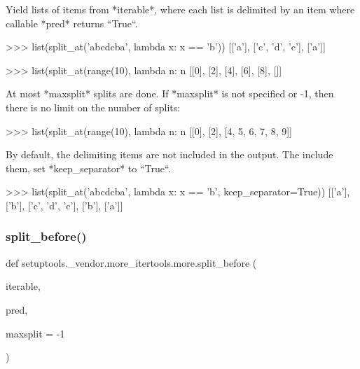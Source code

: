 \begin{DoxyVerb}Yield lists of items from *iterable*, where each list is delimited by
an item where callable *pred* returns ``True``.

    >>> list(split_at('abcdcba', lambda x: x == 'b'))
    [['a'], ['c', 'd', 'c'], ['a']]

    >>> list(split_at(range(10), lambda n: n %
    [[0], [2], [4], [6], [8], []]

At most *maxsplit* splits are done. If *maxsplit* is not specified or -1,
then there is no limit on the number of splits:

    >>> list(split_at(range(10), lambda n: n %
    [[0], [2], [4, 5, 6, 7, 8, 9]]

By default, the delimiting items are not included in the output.
The include them, set *keep_separator* to ``True``.

    >>> list(split_at('abcdcba', lambda x: x == 'b', keep_separator=True))
    [['a'], ['b'], ['c', 'd', 'c'], ['b'], ['a']]\end{DoxyVerb}
 \mbox{\label{namespacesetuptools_1_1__vendor_1_1more__itertools_1_1more_a53b0179aebd5eebdea8737146e6c0d8d}} 
\subsubsection{\texorpdfstring{split\+\_\+before()}{split\_before()}}
{\footnotesize\ttfamily def setuptools.\+\_\+vendor.\+more\+\_\+itertools.\+more.\+split\+\_\+before (\begin{DoxyParamCaption}\item[{}]{iterable,  }\item[{}]{pred,  }\item[{}]{maxsplit = {\ttfamily -\/1} }\end{DoxyParamCaption})}

